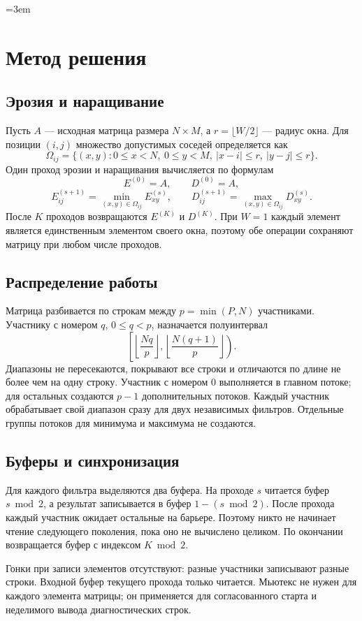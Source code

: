 \begingroup
\emergencystretch=3em
\section{Метод решения}
\subsection{Эрозия и наращивание}
Пусть \(A\) --- исходная матрица размера \(N\times M\), а
\(r=\lfloor W/2\rfloor\) --- радиус окна. Для позиции \((i,j)\)
множество допустимых соседей определяется как
\[
\Omega_{ij}=\{(x,y):0\leq x<N,\ 0\leq y<M,\ |x-i|\leq r,\ |y-j|\leq r\}.
\]
Один проход эрозии и наращивания вычисляется по формулам
\[
E^{(0)}=A,\qquad D^{(0)}=A,
\]
\[
E^{(s+1)}_{ij}=\min_{(x,y)\in\Omega_{ij}} E^{(s)}_{xy},\qquad
D^{(s+1)}_{ij}=\max_{(x,y)\in\Omega_{ij}} D^{(s)}_{xy}.
\]
После \(K\) проходов возвращаются \(E^{(K)}\) и \(D^{(K)}\).
При \(W=1\) каждый элемент является единственным элементом своего окна,
поэтому обе операции сохраняют матрицу при любом числе проходов.

\subsection{Распределение работы}
Матрица разбивается по строкам между \(p=\min(P,N)\) участниками.
Участнику с номером \(q\), \(0\leq q<p\), назначается полуинтервал
\[
\left[\left\lfloor\frac{Nq}{p}\right\rfloor,
      \left\lfloor\frac{N(q+1)}{p}\right\rfloor\right).
\]
Диапазоны не пересекаются, покрывают все строки и отличаются по длине
не более чем на одну строку. Участник с номером 0 выполняется в главном
потоке; для остальных создаются \(p-1\) дополнительных потоков.
Каждый участник обрабатывает свой диапазон сразу для двух независимых
фильтров. Отдельные группы потоков для минимума и максимума не создаются.

\subsection{Буферы и синхронизация}
Для каждого фильтра выделяются два буфера. На проходе \(s\) читается буфер
\(s\bmod2\), а результат записывается в буфер \(1-(s\bmod2)\).
После прохода каждый участник ожидает остальные на барьере. Поэтому
никто не начинает чтение следующего поколения, пока оно не вычислено
целиком. По окончании возвращается буфер с индексом \(K\bmod2\).

Гонки при записи элементов отсутствуют: разные участники записывают
разные строки. Входной буфер текущего прохода только читается.
Мьютекс не нужен для каждого элемента матрицы; он применяется для
согласованного старта и неделимого вывода диагностических строк.


